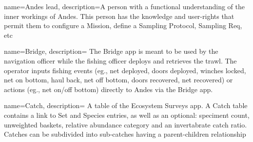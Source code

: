 \usepackage[nonumberlist,acronym,numberedsection]{glossaries}

\makenoidxglossaries

 {
    name=Andes lead,
    description={A person with a functional understanding of the inner workings of Andes.
    This person has the knowledge and user-rights that permit them to configure a \gls{Mission}, define a \gls{Sampling Protocol}, \gls{Sampling Req}, etc}
}







 {
    name=Bridge,
    description={
        The Bridge app is meant to be used by the navigation officer while the fishing officer deploys and retrieves the trawl. The operator inputs fishing events (eg., net deployed, doors deployed, winches locked, net on bottom, haul back, net off bottom, doors recovered, net recovered) or actions (eg., net on/off bottom) directly to Andes via the Bridge app.
    }
}

 {
    name=Catch,
    description={
        A table of the Ecosystem Surveys app. A Catch table contains a link to \gls{Set} and \gls{Species} entries, as well as an optional: speciment count, unweighted baskets, relative abundance category and an invertabrate catch ratio. Catches can be subdivided into sub-catches having a parent-children relationship}
}

